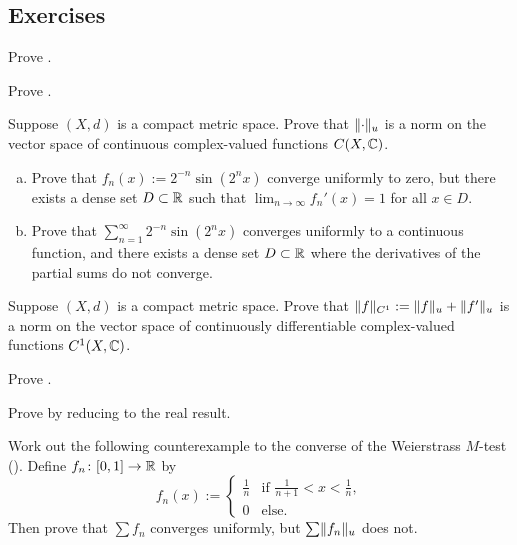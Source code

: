 \subsection{Exercises}

\begin{exercise}
Prove .
\end{exercise}

\begin{exercise}
Prove .
\end{exercise}

\begin{exercise}
Suppose $(X,d)$ is a compact metric space.
Prove that $\lVert {\cdot} \rVert_u$ is a norm on the vector space of
continuous complex-valued functions $C(X,{\mathbb{C}})$.
\end{exercise}

\begin{exercise}
\leavevmode
\begin{enumerate}[a)]
\item
Prove that
$f_n(x) := 2^{-n} \sin(2^n x)$
converge uniformly to zero, but there exists a dense set $D \subset {\mathbb{R}}$
such that $\lim_{n\to\infty} f_n'(x) = 1$ for all $x \in D$.
\item
Prove that
$\sum_{n=1}^\infty 2^{-n} \sin(2^n x)$
converges uniformly to a continuous function,
and there exists a dense set $D \subset {\mathbb{R}}$
where the derivatives of the partial sums do not converge.
\end{enumerate}
\end{exercise}

\begin{exercise}
Suppose $(X,d)$ is a compact metric space.
Prove that $\lVert {f} \rVert_{C^1} := \lVert {f} \rVert_u+\lVert {f'} \rVert_u$
is a norm on the vector space of
continuously differentiable complex-valued functions $C^1(X,{\mathbb{C}})$.
\end{exercise}

\begin{exercise}
Prove .
\end{exercise}

\begin{exercise}
Prove  by reducing to the real
result.
\end{exercise}

\begin{exercise}
Work out the following counterexample to the converse of
the Weierstrass $M$-test ().  Define
$f_n \colon [0,1] \to {\mathbb{R}}$ by
\begin{equation*}
f_n(x) :=
\begin{cases}
\frac{1}{n} & \text{if } \frac{1}{n+1} < x < \frac{1}{n},\\
0	    & \text{else.}
\end{cases}
\end{equation*}
Then prove that $\sum f_n$ converges uniformly, but $\sum \lVert {f_n} \rVert_u$
does not.
\end{exercise}

